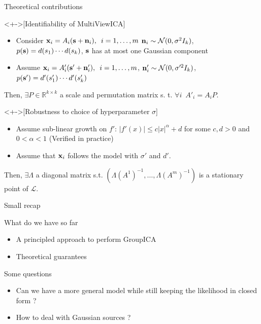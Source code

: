\documentclass[bigger]{beamer}
\begin{document}
\begin{frame}[label={sec:org50c428c}]{Theoretical contributions}
\begin{theorem}<+->[Identifiability of MultiViewICA]
\begin{itemize}
\item Consider \(\mathbf{x}_i = A_i(\mathbf{s} + \mathbf{n}_i), \enspace
  i=1,\dots, m\) \(\mathbf{n}_i \sim \mathcal{N}(0, \sigma^2 I_k)\), \(p(\mathbf{s}) = d(s_1)
  \cdots d(s_k)\), $\mathbf{s}$ has at most one Gaussian component

\item Assume \(\mathbf{x}_i = A'_i(\mathbf{s}' + \mathbf{n}'_i), \enspace i=1,\dots, m\), \(\mathbf{n}'_i
  \sim \mathcal{N}(0, \sigma'^2 I_k)\), \(p(\mathbf{s}') = d'(s'_1) \cdots d'(s'_k)\)
\end{itemize}

Then, \(\exists P\in \mathbb{R}^{k\times k}\) a scale and permutation matrix s.
t. \(\forall i \enspace A'_i = A_i P\).
\end{theorem}
\begin{theorem}<+->[Robustness to choice of hyperparameter \(\sigma\)]
\begin{itemize}
\item Assume sub-linear growth on \(f'\): \(|f'(x)|\leq c|x|^{\alpha} + d\) for
  some \(c, d > 0\) and \(0<\alpha<1\) (Verified in practice)
\item Assume that \(\mathbf{x}_i\) follows the model with \(\sigma'\) and \(d'\).
\end{itemize}
Then, \(\exists \Lambda\) a diagonal matrix s.t. \((\Lambda (A^1)^{-1}, \dots, \Lambda (A^m)^{-1})\) is a stationary point of \(\mathcal{L}\).
\end{theorem}
\end{frame}

\begin{frame}{Small recap}
  \begin{block}{What do we have so far}
    \begin{itemize}
    \item A principled approach to perform GroupICA
    \item Theoretical guarantees
    \end{itemize}
  \end{block}
  \begin{block}{Some questions}
    \begin{itemize}
    \item Can we have a more general model while still keeping the likelihood in
      closed form ?
    \item How to deal with Gaussian sources ?
    \end{itemize}
  \end{block}
\end{frame}
\end{document}
